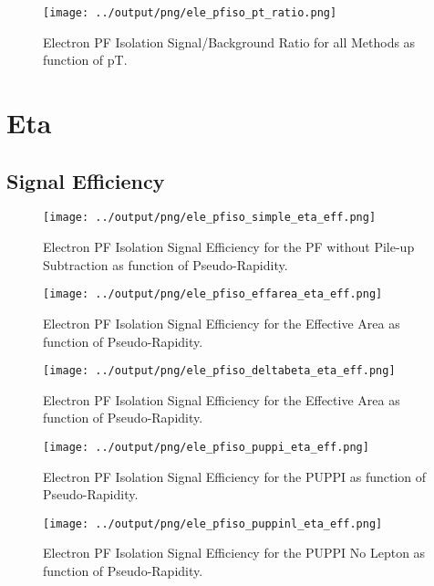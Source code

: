 \documentclass[11pt]{book}
\begin{document}
\begin{figure}[htb]
\centering
\texttt{[image: ../output/png/ele\_pfiso\_pt\_ratio.png]}
\caption{Electron PF Isolation Signal/Background Ratio for all Methods as function of pT.}
\label{fig:ele_pfiso_pt_ratio}
\end{figure}
\clearpage


\section{Eta}

\subsection{Signal Efficiency}
\begin{figure}[htb]
\centering
\texttt{[image: ../output/png/ele\_pfiso\_simple\_eta\_eff.png]}
\caption{Electron PF Isolation Signal Efficiency for the PF without Pile-up Subtraction as function of Pseudo-Rapidity.}
\label{fig:ele_pfiso_eta_eff_simple}
\end{figure}

\begin{figure}[htb]
\centering
\texttt{[image: ../output/png/ele\_pfiso\_effarea\_eta\_eff.png]}
\caption{Electron PF Isolation Signal Efficiency for the Effective Area as function of Pseudo-Rapidity.}
\label{fig:ele_pfiso_eta_eff_effarea}
\end{figure}

\begin{figure}[htb]
\centering
\texttt{[image: ../output/png/ele\_pfiso\_deltabeta\_eta\_eff.png]}
\caption{Electron PF Isolation Signal Efficiency for the Effective Area as function of Pseudo-Rapidity.}
\label{fig:ele_pfiso_eta_eff_deltabeta}
\end{figure}

\begin{figure}[htb]
\centering
\texttt{[image: ../output/png/ele\_pfiso\_puppi\_eta\_eff.png]}
\caption{Electron PF Isolation Signal Efficiency for the PUPPI as function of Pseudo-Rapidity.}
\label{fig:ele_pfiso_eta_eff_puppi}
\end{figure}

\begin{figure}[htb]
\centering
\texttt{[image: ../output/png/ele\_pfiso\_puppinl\_eta\_eff.png]}
\caption{Electron PF Isolation Signal Efficiency for the PUPPI No Lepton as function of Pseudo-Rapidity.}
\label{fig:ele_pfiso_eta_eff_puppinl}
\end{figure}
\end{document}
